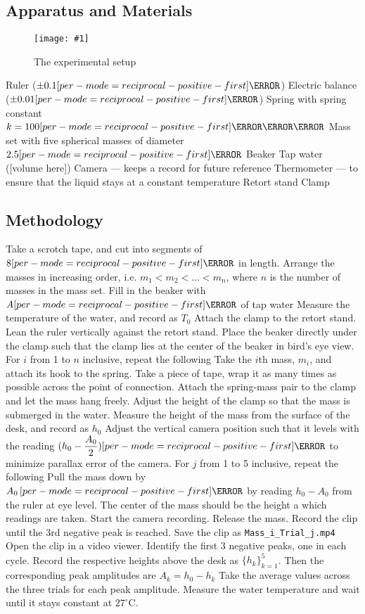 \documentclass[a4paper,12pt]{article}
\let\oldsi\si
\renewcommand{\si}[1]{\oldsi[per-mode=reciprocal-positive-first]{#1}}
\newcommand{\degsym}{^{\circ}}
\newcommand{\img}[4]{\begin{center}
  \begin{figure}[H]
    \centering
    \texttt{[image: \#1]}
    \caption{#3}
    \label{fig:#4}
  \end{figure}
\end{center}}
\begin{document}
\pagebreak

\subsection{Apparatus and Materials}
\img{figs/setup.png}{0.8}{The experimental setup}{setup}
\begin{outline}[enumerate]
  \1 Ruler ($\pm 0.1\si{\cm}$)
  \1 Electric balance ($\pm 0.01\si{\g}$)
  \1 Spring with spring constant $k = 100\si{\N\per\m}$
  \1 Mass set with five spherical masses of diameter $2.5\si{\cm}$
  \1 Beaker
  \1 Tap water ([volume here])
  \1 Camera --- keeps a record for future reference
  \1 Thermometer --- to ensure that the liquid stays at a constant temperature
  \1 Retort stand
  \1 Clamp
\end{outline}

\subsection{Methodology}

\begin{outline}[enumerate]
  \1 Take a scrotch tape, and cut into segments of $8\si{\cm}$ in length.
  \1 Arrange the masses in increasing order, i.e. $m_1 < m_2 < ... < m_n$, where $n$ is the number of masses in the mass set.
  \1 Fill in the beaker with $A\si{\mL}$ of tap water
  \1 Measure the temperature of the water, and record as $T_0$
  \1 Attach the clamp to the retort stand.
  \1 Lean the ruler vertically against the retort stand.
  \1 Place the beaker directly under the clamp such that the clamp lies at the center of the beaker in bird's eye view.
  \1 For $i$ from 1 to $n$ inclusive, repeat the following
  \2 Take the $i$th mass, $m_i$, and attach its hook to the spring.
  \2 Take a piece of tape, wrap it as many times as possible across the point of connection.
  \2 Attach the spring-mass pair to the clamp and let the mass hang freely.
  \2 Adjust the height of the clamp so that the mass is submerged in the water.
  \2 Measure the height of the mass from the surface of the desk, and record as $h_0$
  \2 Adjust the vertical camera position such that it levels with the reading $(h_0 - \dfrac{A_0}{2}) \si{\cm}$ to minimize parallax error of the camera.
  \2 For $j$ from 1 to 5 inclusive, repeat the following
  \3 Pull the mass down by $A_0\,\si{\cm}$ by reading $h_0 - A_0$ from the ruler at eye level. The center of the mass should be the height a which readings are taken.
  \3 Start the camera recording.
  \3 Release the mass.
  \3 Record the clip until the 3rd negative peak is reached.
  \3 Save the clip as \verb|Mass_i_Trial_j.mp4|
  \3 Open the clip in a video viewer.
  \3 Identify the first 3 negative peaks, one in each cycle.
  \3 Record the respective heights above the desk as $\{h_k\}^{5}_{k=1}$.
  \3 Then the corresponding peak amplitudes are $A_k = h_0 - h_{k}$
  \2 Take the average values across the three trials for each peak amplitude.
  \2 Measure the water temperature and wait until it stays constant at $27\degsym \text{C}$.
\end{outline}
\end{document}

